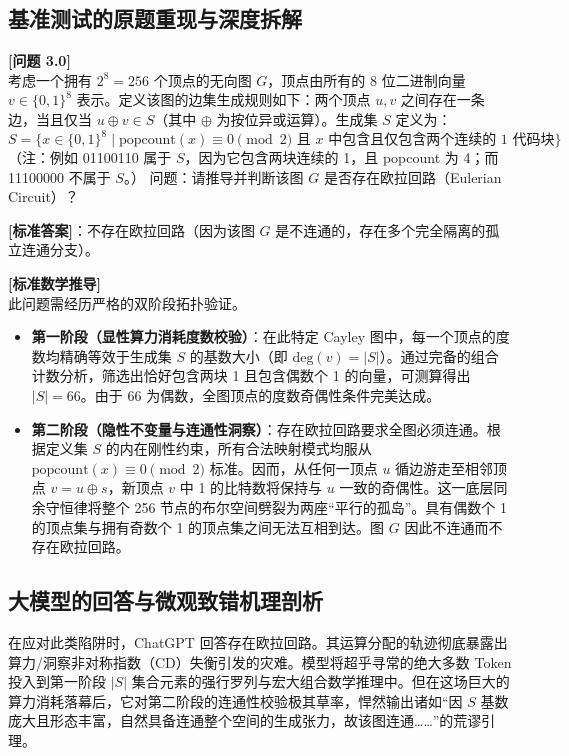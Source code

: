 \documentclass[12pt, a4paper]{report}
\begin{document}
\subsection{基准测试的原题重现与深度拆解}

\textbf{[问题 3.0]} \\
考虑一个拥有 $2^8 = 256$ 个顶点的无向图 $G$，顶点由所有的 8 位二进制向量 $v \in \{0, 1\}^8$ 表示。定义该图的边集生成规则如下：两个顶点 $u, v$ 之间存在一条边，当且仅当 $u \oplus v \in S$（其中 $\oplus$ 为按位异或运算）。生成集 $S$ 定义为：
$$S = \{ x \in \{0, 1\}^8 \mid \text{popcount}(x) \equiv 0 \pmod 2 \text{ 且 } x \text{ 中包含且仅包含两个连续的 1 代码块} \}$$
（注：例如 01100110 属于 $S$，因为它包含两块连续的 1，且 popcount 为 4；而 11100000 不属于 $S$。）
问题：请推导并判断该图 $G$ 是否存在欧拉回路（Eulerian Circuit）？

\textbf{[标准答案]}：不存在欧拉回路（因为该图 $G$ 是不连通的，存在多个完全隔离的孤立连通分支）。

\textbf{[标准数学推导]} \\
此问题需经历严格的双阶段拓扑验证。
\begin{itemize}
    \item \textbf{第一阶段（显性算力消耗度数校验）}：在此特定 Cayley 图中，每一个顶点的度数均精确等效于生成集 $S$ 的基数大小（即 $\text{deg}(v) = |S|$）。通过完备的组合计数分析，筛选出恰好包含两块 1 且包含偶数个 1 的向量，可测算得出 $|S| = 66$。由于 66 为偶数，全图顶点的度数奇偶性条件完美达成。
    \item \textbf{第二阶段（隐性不变量与连通性洞察）}：存在欧拉回路要求全图必须连通。根据定义集 $S$ 的内在刚性约束，所有合法映射模式均服从 $\text{popcount}(x) \equiv 0 \pmod 2$ 标准。因而，从任何一顶点 $u$ 循边游走至相邻顶点 $v = u \oplus s$，新顶点 $v$ 中 1 的比特数将保持与 $u$ 一致的奇偶性。这一底层同余守恒律将整个 256 节点的布尔空间劈裂为两座“平行的孤岛”。具有偶数个 1 的顶点集与拥有奇数个 1 的顶点集之间无法互相到达。图 $G$ 因此不连通而不存在欧拉回路。
\end{itemize}

\subsection{大模型的回答与微观致错机理剖析}

在应对此类陷阱时，ChatGPT 回答存在欧拉回路。其运算分配的轨迹彻底暴露出算力/洞察非对称指数（CD）失衡引发的灾难。模型将超乎寻常的绝大多数 Token 投入到第一阶段 $|S|$ 集合元素的强行罗列与宏大组合数学推理中。但在这场巨大的算力消耗落幕后，它对第二阶段的连通性校验极其草率，悍然输出诸如“因 $S$ 基数庞大且形态丰富，自然具备连通整个空间的生成张力，故该图连通……”的荒谬引理。
\end{document}
